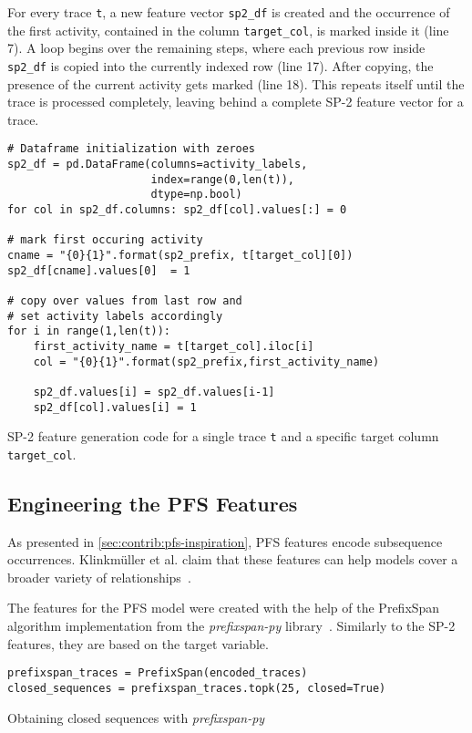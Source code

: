 For every trace \verb=t=, a new feature vector \verb=sp2_df= is created and the occurrence of the first activity, contained in the column \verb=target_col=, is marked inside it (line 7). A loop begins over the remaining steps, where each previous row inside \texttt{sp2\_df} is copied into the currently indexed row (line 17). After copying, the presence of the current activity gets marked (line 18). This repeats itself until the trace is processed completely, leaving behind a complete SP-2 feature vector for a trace.

\begin{listing}[ht]
\begin{verbatim}
# Dataframe initialization with zeroes
sp2_df = pd.DataFrame(columns=activity_labels,
                      index=range(0,len(t)),
                      dtype=np.bool)
for col in sp2_df.columns: sp2_df[col].values[:] = 0

# mark first occuring activity
cname = "{0}{1}".format(sp2_prefix, t[target_col][0])
sp2_df[cname].values[0]  = 1

# copy over values from last row and
# set activity labels accordingly
for i in range(1,len(t)):
    first_activity_name = t[target_col].iloc[i]
    col = "{0}{1}".format(sp2_prefix,first_activity_name)

    sp2_df.values[i] = sp2_df.values[i-1]
    sp2_df[col].values[i] = 1
\end{verbatim}
\caption[SP-2 feature generation code]{SP-2 feature generation code for a single trace \texttt{t} and a specific target column \texttt{target\_col}.}
\label{lst:sp2-generation}
\end{listing}

\FloatBarrier
\subsection*{Engineering the PFS Features}
As presented in \autoref{sec:contrib:pfs-inspiration}, PFS features encode subsequence occurrences. Klinkmüller et al. claim that these features can help models cover a broader variety of relationships~\cite{klinkmuller2018reliablemonitoring}.

The features for the PFS model were created with the help of the PrefixSpan algorithm implementation from the \textit{prefixspan-py} library~\cite{web:prefixspan-py}. Similarly to the SP-2 features, they are based on the target variable.

\begin{listing}[ht]
\begin{verbatim}
prefixspan_traces = PrefixSpan(encoded_traces)
closed_sequences = prefixspan_traces.topk(25, closed=True)
\end{verbatim}
\caption{Obtaining closed sequences with \textit{prefixspan-py}}
\label{lst:pfs-mining}
\end{listing}

